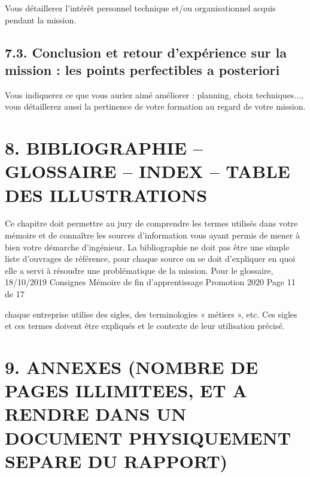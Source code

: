 \documentclass[a4paper, 12pt]{article}
\begin{document}
Vous détaillerez l’intérêt personnel technique et/ou organisationnel acquis pendant la mission.

    
    \newpage{}
    
\subsection{7.3. Conclusion et retour d'expérience sur la mission : les points perfectibles a posteriori}

Vous indiquerez ce que vous auriez aimé améliorer : planning, choix techniques..., vous
détaillerez aussi la pertinence de votre formation au regard de votre mission.

    
    \newpage{}
    
\newpage{}
\section{8. BIBLIOGRAPHIE – GLOSSAIRE – INDEX – TABLE DES ILLUSTRATIONS}

Ce chapitre doit permettre au jury de comprendre les termes utilisés dans votre mémoire et de
connaître les sources d’information vous ayant permis de mener à bien votre démarche d’ingénieur.
La bibliographie ne doit pas être une simple liste d’ouvrages de référence, pour chaque source on se
doit d’expliquer en quoi elle a servi à résoudre une problématique de la mission. Pour le glossaire,
18/10/2019 Consignes Mémoire de fin d'apprentissage Promotion 2020 Page 11 de 17

chaque entreprise utilise des sigles, des terminologies « métiers », etc. Ces sigles et ces termes doivent
être expliqués et le contexte de leur utilisation précisé.



\newpage{}

\printglossary[title={Glossaire}, toctitle={Glossaire}]
\newpage{}

\listoffigures
\newpage{}

% 
% 
%
\printbibliography
\newpage{}

\section{9. ANNEXES (NOMBRE DE PAGES ILLIMITEES, ET A RENDRE DANS UN DOCUMENT PHYSIQUEMENT SEPARE DU RAPPORT)}
\end{document}

